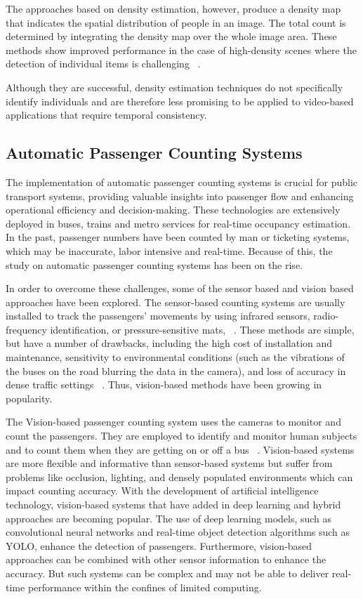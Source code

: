 The approaches based on density estimation, however, produce a density map that indicates the spatial distribution of people in an image. The total count is determined by integrating the density map over the whole image area. These methods show improved performance in the case of high-density scenes where the detection of individual items is challenging ~\cite{Zhang2016}.

Although they are successful, density estimation techniques do not specifically identify individuals and are therefore less promising to be applied to video-based applications that require temporal consistency.

\subsection{Automatic Passenger Counting Systems}

The implementation of automatic passenger counting systems is crucial for public transport systems, providing valuable insights into passenger flow and enhancing operational efficiency and decision-making. These technologies are extensively deployed in buses, trains and metro services for real-time occupancy estimation. In the past, passenger numbers have been counted by man or ticketing systems, which may be inaccurate, labor intensive and real-time. Because of this, the study on automatic passenger counting systems has been on the rise.

In order to overcome these challenges, some of the sensor based and vision based approaches have been explored. The sensor-based counting systems are usually installed to track the passengers' movements by using infrared sensors, radio-frequency identification, or pressure-sensitive mats, ~\cite{Aleksander2024}. These methods are simple, but have a number of drawbacks, including the high cost of installation and maintenance, sensitivity to environmental conditions (such as the vibrations of the buses on the road blurring the data in the camera), and loss of accuracy in dense traffic settings ~\cite{Irene2019}. Thus, vision-based methods have been growing in popularity.

The Vision-based passenger counting system uses the cameras to monitor and count the passengers. They are employed to identify and monitor human subjects and to count them when they are getting on or off a bus ~\cite{Saddam2020}. Vision-based systems are more flexible and informative than sensor-based systems but suffer from problems like occlusion, lighting, and densely populated environments which can impact counting accuracy. With the development of artificial intelligence technology, vision-based systems that have added in deep learning and hybrid approaches are becoming popular. The use of deep learning models, such as convolutional neural networks and real-time object detection algorithms such as YOLO, enhance the detection of passengers. Furthermore, vision-based approaches can be combined with other sensor information to enhance the accuracy. But such systems can be complex and may not be able to deliver real-time performance within the confines of limited computing. 

